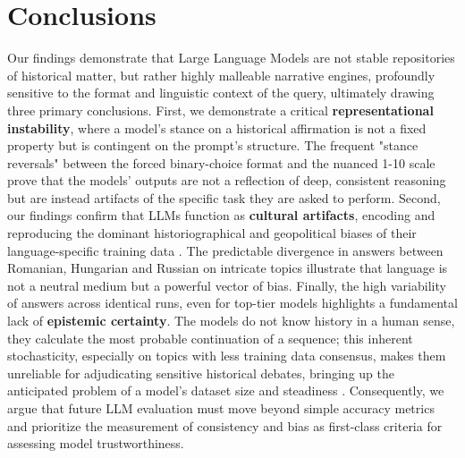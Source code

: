 \documentclass[11pt]{article}
\begin{document}
\section{Conclusions}
Our findings demonstrate that Large Language Models are not stable repositories of historical matter, but rather highly malleable narrative engines, profoundly sensitive to the format and linguistic context of the query, ultimately drawing three primary conclusions. First, we demonstrate a critical \textbf{representational instability}, where a model's stance on a historical affirmation is not a fixed property but is contingent on the prompt's structure. The frequent "stance reversals" between the forced binary-choice format and the nuanced 1-10 scale prove that the models' outputs are not a reflection of deep, consistent reasoning but are instead artifacts of the specific task they are asked to perform. Second, our findings confirm that LLMs function as \textbf{cultural artifacts}, encoding and reproducing the dominant historiographical and geopolitical biases of their language-specific training data \cite{gururangan2022}. The predictable divergence in answers between Romanian, Hungarian and Russian on intricate topics illustrate that language is not a neutral medium but a powerful vector of bias. Finally, the high variability of answers across identical runs, even for top-tier models highlights a fundamental lack of \textbf{epistemic certainty}. The models do not know history in a human sense, they calculate the most probable continuation of a sequence; this inherent stochasticity, especially on topics with less training data consensus, makes them unreliable for adjudicating sensitive historical debates, bringing up the anticipated problem of a model's dataset size and steadiness \cite{bender2021}. Consequently, we argue that future LLM evaluation must move beyond simple accuracy metrics and prioritize the measurement of consistency and bias as first-class criteria for assessing model trustworthiness.
\end{document}
